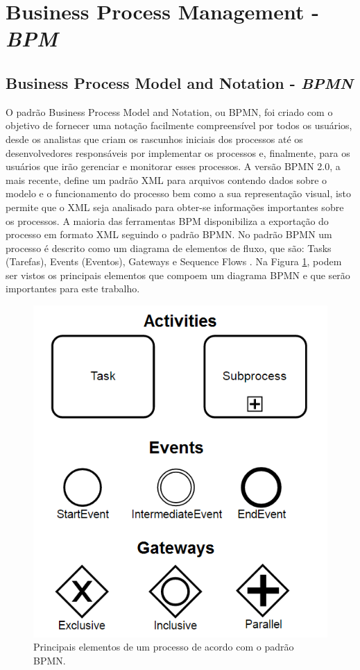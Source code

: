 \documentclass[12pt]{article}
\begin{document}
\section{Business Process Management - \emph{BPM}}

\subsection{Business Process Model and Notation - \emph{BPMN}}
O padrão Business Process Model and Notation, ou BPMN, foi criado com o objetivo de fornecer uma notação facilmente compreensível por todos os usuários, desde os analistas que criam os rascunhos iniciais dos processos até os desenvolvedores responsáveis por implementar os processos e, finalmente, para os usuários que irão gerenciar e monitorar esses processos\cite{model2011notation}. A versão BPMN 2.0, a mais recente, define um padrão XML para arquivos contendo dados sobre o modelo e o funcionamento do processo bem como a sua representação visual\cite{kurzdiagram}, isto permite que o XML seja analisado para obter-se informações importantes sobre os processos. A maioria das ferramentas BPM disponibiliza a exportação do processo em formato XML seguindo o padrão BPMN. No padrão BPMN um processo é descrito como um diagrama de elementos de fluxo, que são: Tasks (Tarefas), Events (Eventos), Gateways e Sequence Flows \cite{kurzdiagram}. Na Figura \ref{fig:bpmn}, podem ser vistos os principais elementos que compoem um diagrama BPMN e que serão importantes para este trabalho.


\begin{figure}[ht]
\centering
\includegraphics[width=.8\textwidth]{figuras/bpmn.png}
\caption{Principais elementos de um processo de acordo com o padrão BPMN.}
\label{fig:bpmn}
\end{figure}
\end{document}
